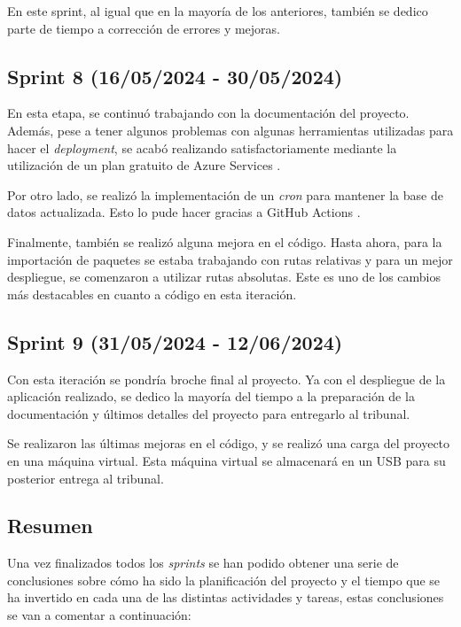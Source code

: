 En este sprint, al igual que en la mayoría de los anteriores, también se dedico parte de tiempo a corrección de errores y mejoras.


\subsection{Sprint 8 (16/05/2024 -
30/05/2024)}
En esta etapa, se continuó trabajando con la documentación del proyecto. Además, pese a tener algunos problemas con algunas herramientas utilizadas para hacer el \textit{deployment}, se acabó realizando satisfactoriamente mediante la utilización de un plan gratuito de Azure Services \cite{azureservices:latex}. 

Por otro lado, se realizó la implementación de un \textit{cron} para mantener la base de datos actualizada. Esto lo pude hacer gracias a GitHub Actions \cite{githubactions:latex}.

Finalmente, también se realizó alguna mejora en el código. Hasta ahora, para la importación de paquetes se estaba trabajando con rutas relativas y para un mejor despliegue, se comenzaron a utilizar rutas absolutas. Este es uno de los cambios más destacables en cuanto a código en esta iteración.

\subsection{Sprint 9 (31/05/2024 -
12/06/2024)}
Con esta iteración se pondría broche final al proyecto. Ya con el despliegue de la aplicación realizado, se dedico la mayoría del tiempo a la preparación de la documentación y últimos detalles del proyecto para entregarlo al tribunal.

Se realizaron las últimas mejoras en el código,  y se realizó una carga del proyecto en una máquina virtual. Esta máquina virtual se almacenará en un USB para su posterior entrega al tribunal.


\subsection{Resumen}

Una vez finalizados todos los \textit{sprints} se han podido obtener una serie de conclusiones sobre cómo ha sido la planificación del proyecto y el tiempo que se ha invertido en cada una de las distintas actividades y tareas, estas conclusiones se van a comentar a continuación:

